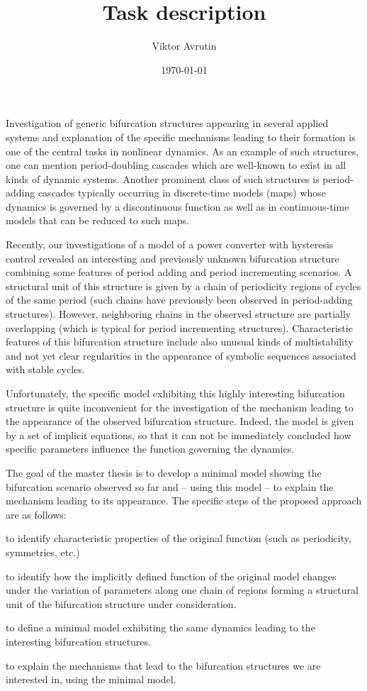 \documentclass{article}
\begin{document}
\title{Task description}
\author{Viktor Avrutin}
\date{\today}
\maketitle

Investigation of generic bifurcation structures appearing in several
applied systems and explanation of the specific mechanisms leading to
their formation is one of the central tasks in nonlinear dynamics.
As an example of such structures, one can mention period-doubling cascades
which are well-known to exist in all kinds of dynamic systems.
Another prominent class of such structures is period-adding cascades
typically occurring in discrete-time models (maps) whose dynamics is
governed by a discontinuous function as well as in continuous-time
models that can be reduced to such maps.

Recently, our investigations of a model of a power converter with
hysteresis control revealed an interesting and previously unknown
bifurcation structure combining some features of period adding and
period incrementing scenarios.  A structural unit of this structure is
given by a chain of periodicity regions of cycles of the same period
(such chains have previously been observed in period-adding structures).
However, neighboring chains in the observed structure are
partially overlapping (which is typical for period incrementing structures).
Characteristic features of this bifurcation structure
include also unusual kinds of multistability and not yet clear
regularities in the appearance of symbolic sequences associated with
stable cycles.

Unfortunately, the specific model exhibiting this highly interesting
bifurcation structure is quite inconvenient for the investigation of the mechanism
leading to the appearance of the observed bifurcation
structure. Indeed, the model is given by a set of implicit equations,
so that it can not be immediately concluded how specific parameters
influence the function governing the dynamics.

The goal of the master thesis is to develop a minimal model showing
the bifurcation scenario observed so far and -- using this model -- to
explain the mechanism leading to its appearance.  The specific steps
of the proposed approach are as follows:
\begin{compactenum}
\item to identify characteristic properties of the original function
  (such as periodicity, symmetries, etc.)
\item to identify how the implicitly defined function of the original
  model changes under the variation of parameters along one chain of regions
  forming a structural unit of the bifurcation structure under consideration.
\item to define a minimal model exhibiting the same dynamics leading to the
  interesting bifurcation structures.
\item to explain the mechanisms that lead to the bifurcation structures
  we are interested in, using the minimal model.
\end{compactenum}
\end{document}
